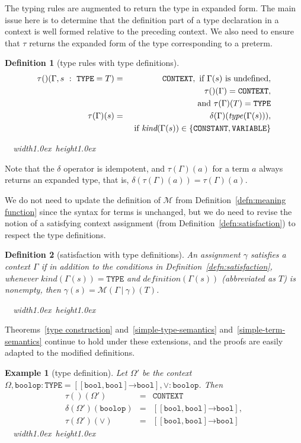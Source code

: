 \documentclass [12pt,twoside]{cslreport}
\newcommand{\thmbox}
   {{\ \hfill\hbox{%
      \vrule width1.0ex height1.0ex
   }\parfillskip 0pt }}
\newtheorem{example}[thm]{Example}
\newcommand{\aro}{\mathord\rightarrow} %
\newcommand{\funtype}[2]{[#1 \aro #2]}
\newcommand{\tupletype}[1]{[#1]}
\newcommand{\tauGamma}[1]{\tau(\Gamma)(#1)}
\newcommand{\Mgamma}[1]{{\mathcal M}(\Gamma\vbar\gamma)(#1)}
\newcommand{\ttbool}{\mathtt{bool}}
\newcommand{\tttype}{\mathtt{TYPE}}
\newcommand{\ttcontext}{\mathtt{CONTEXT}}
\newcommand{\ttconstant}{\mathtt{CONSTANT}}
\newcommand{\ttvariable}{\mathtt{VARIABLE}}
\newcommand{\vbar}{\ |\ }
\newenvironment{Eg}[1]{\begin{example}[#1]\label{eg:#1}\em }{\thmbox\end{example}}
\newtheorem{definition}{Definition}
\newenvironment{Defn}[1]{\begin{definition}[#1]\label{defn:#1}}{
\thmbox\end{definition}}
\begin{document}
The typing rules are augmented to return the type in expanded form.
The main issue here is to determine that the definition part of a type
declaration in a context is well formed relative to the preceding context.
We also need to ensure that $\tau$ returns the expanded form of the type
corresponding to a preterm.
%
\begin{Defn}{type rules with type definitions}
\begin{eqnarray*}
    \tau()(\Gamma, s\ :\ \tttype{} = T) & = & \ttcontext, \mbox{
if }  \Gamma(s) \mbox{ is undefined}, \\ & &
\tau()(\Gamma) = \ttcontext,\\ & & 
  \mbox{and }     \tauGamma{T} = \tttype{} \\
%
%
    \tau(\Gamma)(s) & = &  \delta(\Gamma)(\textit{type\/}(\Gamma(s))),\\
                    & &  \mbox{ if } 
\textit{kind}(\Gamma(s)) \in \{ \ttconstant{}, \ttvariable \} 
\end{eqnarray*}
\end{Defn}


Note that the $\delta$ operator is idempotent, and $\tauGamma{a}$
for a term $a$ always returns an expanded type, that is, 
$\delta(\tauGamma{a}) = \tauGamma{a}$\@.  

We do not need to update the definition of ${\mathcal M}$ from
Definition~\ref{defn:meaning function} since the syntax for terms is
unchanged, 
but we do need
to revise the notion of a satisfying context assignment (from 
Definition~\ref{defn:satisfaction}) to respect the type
definitions.
\begin{Defn}{satisfaction with type definitions}
An assignment $\gamma$ satisfies a context $\Gamma$ if
in addition to the conditions in Definition~\ref{defn:satisfaction},
whenever $ \textit{kind}(\Gamma(s)) = \tttype{}$ and
$\textit{definition}(\Gamma(s))$ (abbreviated as $T$) is nonempty, then
$\gamma(s) = \Mgamma{ T}$.
\end{Defn}

Theorems~\ref{type construction} and~\ref{simple-type-semantics}
and~\ref{simple-term-semantics} continue to hold under these extensions,
and the proofs are easily adapted to the modified definitions.  

\begin{Eg}{type definition}
Let $\Omega'$ be the context\\ $\Omega,
\mathtt{boolop}:\mathtt{TYPE}=\funtype{\tupletype{\mathtt{bool}, \mathtt{bool}}}{\ttbool},
\vee:\mathtt{boolop}$\@.  Then
\begin{eqnarray*}
\tau()(\Omega') & = & \mathtt{CONTEXT}\\
%
 \delta(\Omega')( \mathtt{boolop})  & = & \funtype{\tupletype{ \mathtt{bool},
\mathtt{bool}}}{\ttbool},\\
 \tau(\Omega')( \vee) & = & \funtype{\tupletype{ \mathtt{bool}, \mathtt{bool}}}{\ttbool}
\end{eqnarray*}
\end{Eg}
\end{document}
